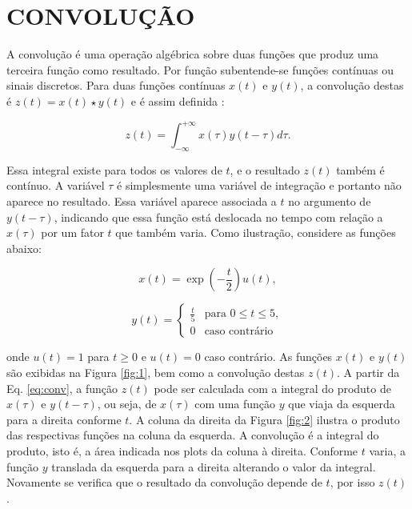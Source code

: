 
\chapter{CONVOLUÇÃO}

A convolução é uma operação algébrica sobre duas funções que produz uma terceira função como resultado. Por função subentende-se funções contínuas ou sinais discretos. Para duas funções contínuas $x(t)$ e $y(t)$, a convolução destas é $z(t) = x(t) \star y(t)$ e é assim definida \cite{paris2001convolution}:

\begin{equation}
z(t) = \int_{-\infty}^{+\infty}x(\tau)y(t-\tau)d\tau.
\end{equation}

Essa integral existe para todos os valores de $t$, e o resultado $z(t)$ também é contínuo. A variável $\tau$ é simplesmente uma variável de integração e portanto não aparece no resultado. Essa variável aparece associada a $t$ no argumento de $y(t-\tau)$, indicando que essa função está deslocada no tempo com relação a $x(\tau)$ por um fator $t$ que também varia. Como ilustração, considere as funções abaixo:

\begin{equation}
x(t) = \exp\left(-\frac{t}{2}\right) u(t),
\label{eq:conv}
\end{equation}

\begin{equation*}
y(t) =  \left\{ \begin{array}{rl} 
\frac{t}{5}  & \text{para } 0 \leq t \leq 5,  \\
0 & \text{caso contrário}
\end{array}\right.
\end{equation*}

onde $u(t)=1$ para $t \geq 0$ e $u(t)=0$ caso contrário. As funções $x(t)$ e $y(t)$ são exibidas na Figura \ref{fig:1}, bem como a convolução destas $z(t)$. A partir da Eq. \ref{eq:conv}, a função $z(t)$ pode ser calculada com a integral do produto de $x(\tau)$ e $y(t-\tau)$, ou seja, de $x(\tau)$ com uma função $y$ que viaja da esquerda para a direita conforme $t$. A coluna da direita da Figura \ref{fig:2} ilustra o produto das respectivas funções na coluna da esquerda. A convolução é a integral do produto, isto é, a área indicada nos plots da coluna à direita. Conforme $t$ varia, a função $y$ translada da esquerda para a direita alterando o valor da integral. Novamente se verifica que o resultado da convolução depende de $t$, por isso $z(t)$.  

